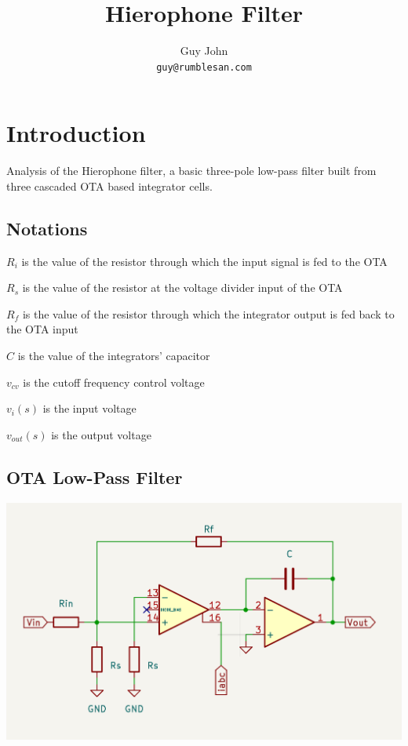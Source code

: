 \documentclass{article}
\title{Hierophone Filter}
\author{Guy John \\ \texttt{guy@rumblesan.com}}
\begin{document}
\maketitle

\section{Introduction}
Analysis of the Hierophone filter, a basic three-pole low-pass filter built from three cascaded OTA based integrator cells.

\newpage

\subsection{Notations}

\begin{description}
\item $R_i$ is the value of the resistor through which the input signal is fed to the OTA
\item $R_s$ is the value of the resistor at the voltage divider input of the OTA
\item $R_f$ is the value of the resistor through which the integrator output is fed back to the OTA input
\item $C$ is the value of the integrators' capacitor
\item $v_{cv}$ is the cutoff frequency control voltage
\item $v_i(s)$ is the input voltage
\item $v_{out}(s)$ is the output voltage
\end{description}

\subsection{OTA Low-Pass Filter}

\includegraphics[width=\linewidth]{images/ota-low-pass.png}
\end{document}

